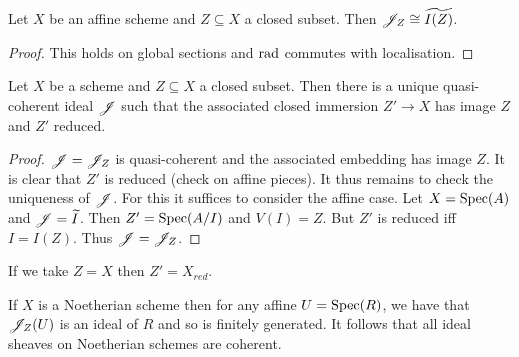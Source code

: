 \documentclass{memoir}
\begin{document}
\begin{lemma}
    Let $X$ be an affine scheme and $Z\subseteq X$ a closed subset. 
    Then $\mathscr{J}_Z\cong \widetilde{I(Z)}$.
\end{lemma}
\begin{proof}
    This holds on global sections and $\text{rad}$ commutes with localisation.
\end{proof}
\begin{thm}
    Let $X$ be a scheme and $Z\subseteq X$ a closed subset.
    Then there is a unique quasi-coherent ideal $\mathscr{J}$ such that the associated closed immersion $Z'\to X$ has image $Z$ and $Z'$ reduced.
\end{thm}
\begin{proof}
    $\mathscr{J} = \mathscr{J}_Z$ is quasi-coherent and the associated embedding has image $Z$.
    It is clear that $Z'$ is reduced (check on affine pieces).
    It thus remains to check the uniqueness of $\mathscr{J}$.
    For this it suffices to consider the affine case.
    Let $X = \operatorname{Spec}(A)$ and $\mathscr{J} = \widetilde I$. 
    Then $Z' = \operatorname{Spec}(A/I)$ and $V(I) = Z$.
    But $Z'$ is reduced iff $I = I(Z)$.
    Thus $\mathscr{J} = \mathscr{J}_{Z}$.
\end{proof}
\begin{remark}
    If we take $Z = X$ then $Z' = X_{red}$.
\end{remark}
\begin{remark}
    If $X$ is a Noetherian scheme then for any affine $U = \operatorname{Spec}(R)$, we have that $\mathscr{J}_Z(U)$ is an ideal of $R$ and so is finitely generated.
    It follows that all ideal sheaves on Noetherian schemes are coherent.
\end{remark}
\end{document}
